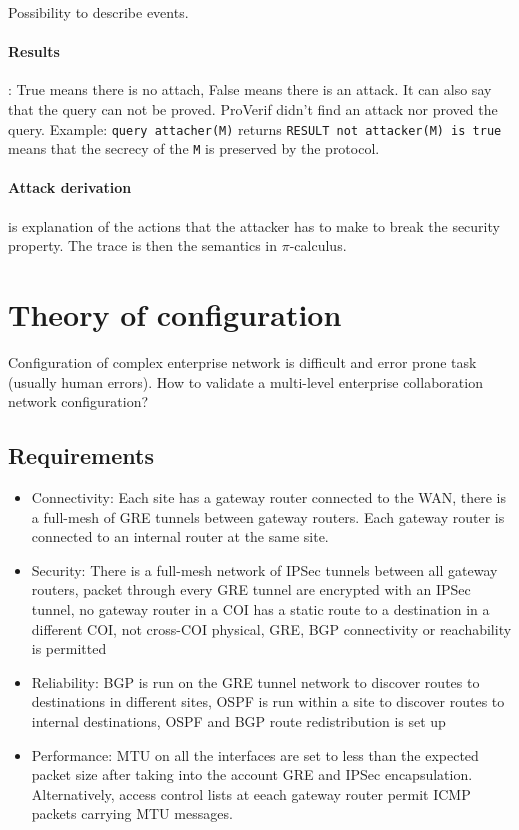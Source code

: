 \documentclass[a4paper, 11pt]{report}
\begin{document}
Possibility to describe events.

\paragraph{Results}: True means there is no attach, False means there is an attack. It can also say that the query can not be proved. ProVerif didn't find an attack nor proved the query. Example: \texttt{query attacher(M)} returns \texttt{RESULT not attacker(M) is true} means that the secrecy of the \texttt{M} is preserved by the protocol.

\paragraph{Attack derivation} is explanation of the actions that the attacker has to make to break the security property. The trace is then the semantics in $\pi$-calculus.

\section{Theory of configuration}

Configuration of complex enterprise network is difficult and error prone task (usually human errors).
How to validate a multi-level enterprise collaboration network configuration?

\subsection{Requirements}
\begin{itemize}
	\item Connectivity: Each site has a gateway router connected to the WAN, there is a full-mesh of GRE tunnels between gateway routers. Each gateway router is connected to an internal router at the same site.
	\item Security: There is a full-mesh network of IPSec tunnels between all gateway routers, packet through every GRE tunnel are encrypted with an IPSec tunnel, no gateway router in a COI has a static route to a destination in a different COI, not cross-COI physical, GRE, BGP connectivity or reachability is permitted
	\item Reliability: BGP is run on the GRE tunnel network to discover routes to destinations in different sites, OSPF is run within a site to discover routes to internal destinations, OSPF and BGP route redistribution is set up
	\item Performance: MTU on all the interfaces are set to less than the expected packet size after taking into the account GRE and IPSec encapsulation. Alternatively, access control lists at eeach gateway router permit ICMP packets carrying MTU messages.
\end{itemize}
\end{document}
